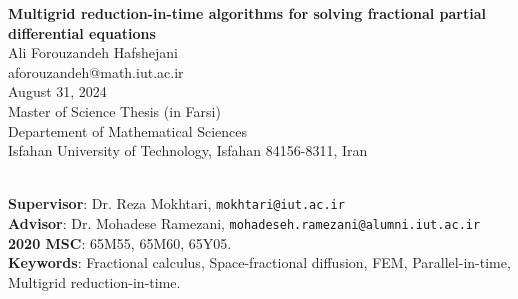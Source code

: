 \fancyhead[LO]{\nouppercase\rightmark\ \hfill\ \thepage}
\fancyhead[LE]{\nouppercase\rightmark\ \hfill\ \thepage}
\renewcommand{\baselinestretch}{.9}
\latin
\tnr
\vspace*{-2cm}
\begin{center}
\textbf{Multigrid reduction-in-time algorithms for solving fractional partial differential equations}
\\
\medskip
Ali Forouzandeh Hafshejani
\\
aforouzandeh@math.iut.ac.ir
\\
August 31, 2024
\\
Master of Science  Thesis (in Farsi)
\\
Departement of Mathematical Sciences
\\
Isfahan University of Technology, Isfahan 84156-8311, Iran
\end{center}
\vskip -5.5mm
\hrulefill
\\
\noindent
\textbf{Supervisor}: Dr. Reza Mokhtari, \texttt{mokhtari@iut.ac.ir}
\\
\textbf{Advisor}: Dr. Mohadese Ramezani, \texttt{mohadeseh.ramezani@alumni.iut.ac.ir}
\\
\textbf{2020 MSC}: 65M55, 65M60, 65Y05.
\\
\textbf{Keywords}: Fractional calculus, Space-fractional diffusion, FEM, Parallel-in-time, Multigrid reduction-in-time.  

